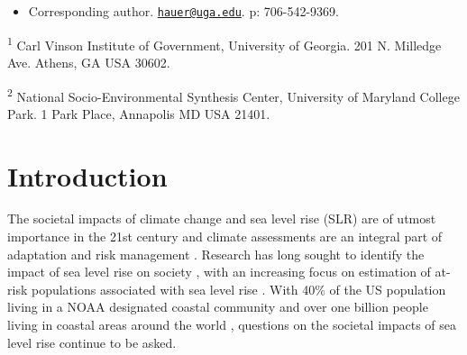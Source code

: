 \documentclass[12pt,]{article}
\providecommand{\tightlist}{%
\setlength{\itemsep}{0pt}\setlength{\parskip}{0pt}}
\begin{document}
\vskip 6.5pt


\noindent \doublespacing \begin{itemize}
\tightlist
\item
  Corresponding author.
  \href{mailto:hauer@uga.edu}{\nolinkurl{hauer@uga.edu}}. p:
  706-542-9369.
\end{itemize}

\textsuperscript{1} Carl Vinson Institute of Government, University of
Georgia. 201 N. Milledge Ave. Athens, GA USA 30602.

\textsuperscript{2} National Socio-Environmental Synthesis Center,
University of Maryland College Park. 1 Park Place, Annapolis MD USA
21401.

\section{Introduction}\label{introduction}

The societal impacts of climate change and sea level rise (SLR) are of
utmost importance in the 21st century and climate assessments are an
integral part of adaptation and risk management
\citep{howden2016innovations}. Research has long sought to identify the
impact of sea level rise on society
\citep{curtis2011understanding, wu2002vulnerability}, with an increasing
focus on estimation of at-risk populations associated with sea level
rise \citep{curtis2011understanding, strauss2015carbon}. With 40\% of
the US population living in a NOAA designated coastal community
\citep{ache2015coast} and over one billion people living in coastal
areas around the world \citep{neumann2015future}, questions on the
societal impacts of sea level rise continue to be asked.
\end{document}
